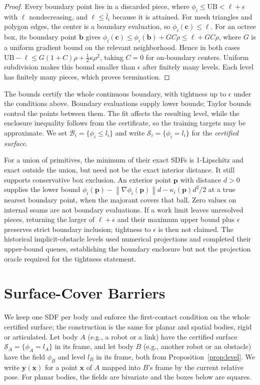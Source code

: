 \documentclass[journal]{IEEEtran}
\theoremstyle{definition}
\newcommand{\norm}[1]{\left\lVert #1\right\rVert}
\begin{document}
\begin{proof}
Every boundary point lies in a discarded piece, where $\phi_i\le\mathrm{UB}<\ell+\epsilon$ with $\ell$
nondecreasing, and $\ell\le\bar l_i$ because it is attained. For mesh triangles and polygon
edges, the center is a boundary evaluation, so $\phi_i(\mathbf c)\le\ell$.
For an octree box, its boundary point $\mathbf b$ gives
$\phi_i(\mathbf c)\le\phi_i(\mathbf b)+GC\rho\le\ell+GC\rho$, where $G$ is a uniform gradient bound
on the relevant neighborhood. Hence in both cases
$\mathrm{UB}-\ell\le G(1+C)\rho+\tfrac12\kappa\rho^2$, taking $C=0$ for on-boundary centers.
Uniform subdivision makes this bound smaller than $\epsilon$ after finitely many levels.
Each level has finitely many pieces, which proves termination.
\end{proof}
The bounds certify the whole continuous boundary, with tightness up to $\epsilon$ under the
conditions above. Boundary evaluations supply lower bounds; Taylor bounds control the points
between them. The fit affects the resulting level, while the enclosure inequality follows from
the certificate, so the training targets may be approximate. We set $\mathcal B_i=\{\phi_i\le l_i\}$ and write
$\mathcal S_i=\{\phi_i=l_i\}$ for the \emph{certified surface}.

For a union of primitives, the minimum of their exact SDFs is 1-Lipschitz and exact outside
the union, but need not be the exact interior distance. It still supports conservative box
exclusion. An exterior point $\mathbf p$ with distance $d>0$ supplies the lower bound
$\phi_i(\mathbf p)-\norm{\nabla\phi_i(\mathbf p)}d-\kappa_i(\mathbf p)d^2/2$ at a true nearest
boundary point, when the majorant covers that ball. Zero values on internal seams are not
boundary evaluations. If a work limit leaves unresolved pieces, returning the larger of
$\ell+\epsilon$ and their maximum upper bound plus $\epsilon$ preserves strict boundary
inclusion; tightness to $\epsilon$ is then not claimed. The historical implicit-obstacle
levels used numerical projections and completed their upper-bound queues, establishing
the boundary enclosure but not the projection oracle required for the tightness statement.

\section{Surface-Cover Barriers}\label{sec:cover}
We keep one SDF per body and enforce the first-contact condition on the whole certified surface; the
construction is the same for planar and spatial bodies, rigid or articulated. Let body $A$ (e.g., a
robot or a link) have the certified surface $\mathcal S_A=\{\phi_A=l_A\}$ in its frame, and let body $B$
(e.g., another robot or an obstacle) have the field $\phi_B$ and level $l_B$ in its frame, both from
Proposition~\ref{prop:level}. We write $\mathbf y(\mathbf x)$ for a point $\mathbf x$ of $A$ mapped into
$B$'s frame by the current relative pose. For planar bodies, the fields are bivariate and the boxes
below are squares.
\end{document}
